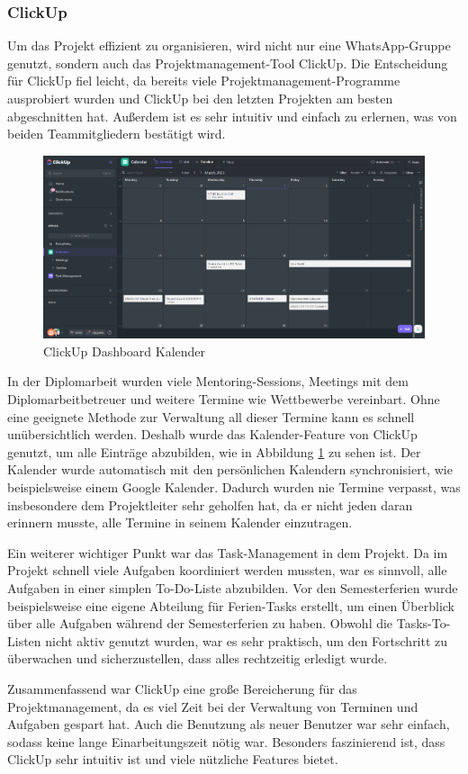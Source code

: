 \subsubsection{ClickUp}
Um das Projekt effizient zu organisieren, wird nicht nur eine WhatsApp-Gruppe genutzt, sondern auch das Projektmanagement-Tool ClickUp. Die Entscheidung für ClickUp fiel leicht, da bereits viele Projektmanagement-Programme ausprobiert wurden und ClickUp bei den letzten Projekten am besten abgeschnitten hat. Außerdem ist es sehr intuitiv und einfach zu erlernen, was von beiden Teammitgliedern bestätigt wird.

\begin{figure}
    \centering
    \includegraphics[width=1\textwidth]{./pics/clickup-calender-view.png}
    \caption{ClickUp Dashboard Kalender}
    \label{fig:clickup-calendar}
\end{figure}


In der Diplomarbeit wurden viele Mentoring-Sessions, Meetings mit dem Diplomarbeitbetreuer und weitere Termine wie Wettbewerbe vereinbart. Ohne eine geeignete Methode zur Verwaltung all dieser Termine kann es schnell unübersichtlich werden. Deshalb wurde das Kalender-Feature von ClickUp genutzt, um alle Einträge abzubilden, wie in Abbildung \ref{fig:clickup-calendar} zu sehen ist. Der Kalender wurde automatisch mit den persönlichen Kalendern synchronisiert, wie beispielsweise einem Google Kalender. Dadurch wurden nie Termine verpasst, was insbesondere dem Projektleiter sehr geholfen hat, da er nicht jeden daran erinnern musste, alle Termine in seinem Kalender einzutragen.

Ein weiterer wichtiger Punkt war das Task-Management in dem Projekt. Da im Projekt schnell viele Aufgaben koordiniert werden mussten, war es sinnvoll, alle Aufgaben in einer simplen To-Do-Liste abzubilden. Vor den Semesterferien wurde beispielsweise eine eigene Abteilung für Ferien-Tasks erstellt, um einen Überblick über alle Aufgaben während der Semesterferien zu haben. Obwohl die Tasks-To-Listen nicht aktiv genutzt wurden, war es sehr praktisch, um den Fortschritt zu überwachen und sicherzustellen, dass alles rechtzeitig erledigt wurde.

Zusammenfassend war ClickUp eine große Bereicherung für das
Projektmanagement, da es viel Zeit bei der Verwaltung von
Terminen und Aufgaben gespart hat. Auch die Benutzung als
neuer Benutzer war sehr einfach, sodass keine lange
Einarbeitungszeit nötig war. Besonders faszinierend ist,
dass ClickUp sehr intuitiv ist und viele nützliche Features
bietet.

